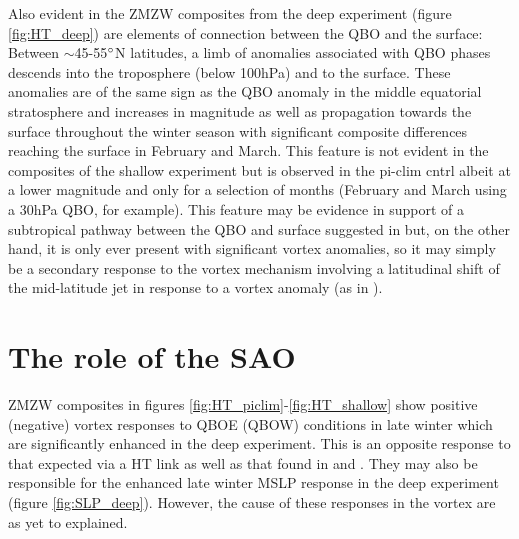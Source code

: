 Also evident in the ZMZW composites from the deep experiment (figure \ref{fig:HT_deep}) are elements of connection between the QBO and the surface: Between $\sim$45-55$\degree$N latitudes, a limb of anomalies associated with QBO phases descends into the troposphere (below 100hPa) and to the surface. These anomalies are of the same sign as the QBO anomaly in the middle equatorial stratosphere and increases in magnitude as well as propagation towards the surface throughout the winter season with significant composite differences reaching the surface in February and March. This feature is not evident in the composites of the shallow experiment but is observed in the pi-clim cntrl albeit at a lower magnitude and only for a selection of months (February and March using a 30hPa QBO, for example). This feature may be evidence in support of a subtropical pathway between the QBO and surface suggested in \cite{graySurface2018b} but, on the other hand, it is only ever present with significant vortex anomalies, so it may simply be a secondary response to the vortex mechanism involving a latitudinal shift of the mid-latitude jet in response to a vortex anomaly (as in \cite{baldwinStratospheric2001a}). 

\section{The role of the SAO}
\label{sec:role_SAO}

ZMZW composites in figures \ref{fig:HT_piclim}-\ref{fig:HT_shallow} show positive (negative) vortex responses to QBOE (QBOW) conditions in late winter which are significantly enhanced in the deep experiment. This is an opposite response to that expected via a HT link as well as that found in \cite{andrewsObserved2019d} and \cite{graySurface2018b}. They may also be responsible for the enhanced late winter MSLP response in the deep experiment (figure \ref{fig:SLP_deep}). However, the cause of these responses in the vortex are as yet to explained. 

